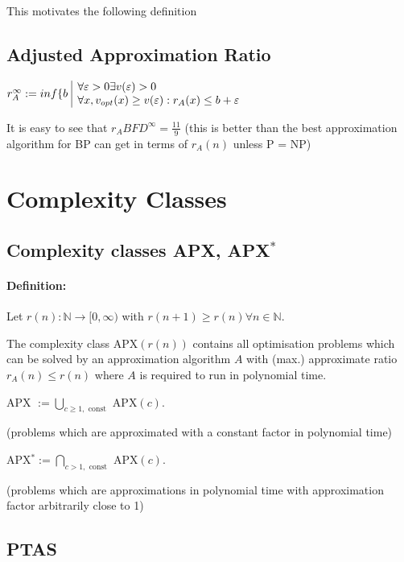\documentclass[11pt]{article}
\theoremstyle{definition}
\theoremstyle{definition}
\begin{document}

This motivates the following definition

\subsection{Adjusted Approximation Ratio}

$ r_A^\infty := inf \{ b ~ \begin{array}{| l} \forall \varepsilon > 0 \exists v(\varepsilon) > 0 \\ \forall x, v_{opt}(x) \geq v(\varepsilon) : r_A (x) \leq b + \varepsilon \end{array} $

It is easy to see that $ r_A{BFD}^\infty = \frac{11}{9} $ (this is better than the best approximation algorithm for BP can get in terms of $ r_A(n) $ unless P = NP)

\section{Complexity Classes}
\subsection{Complexity classes APX, APX$^\ast$}

\paragraph{Definition:} Let $ r(n) : \mathbb{N} \rightarrow [0, \infty) $ with $ r(n + 1) \geq r(n) \forall n \in \mathbb{N} $.

The complexity class APX$(r(n)) $ contains all optimisation problems which can be solved by an approximation algorithm $ A $ with (max.) approximate ratio $ r_A(n) \leq r(n) $ where $ A $ is required to run in polynomial time. \medskip

APX $ := \bigcup \limits_{c \geq 1, \text{ const}} $ APX$(c) $.

(problems which are approximated with a constant factor in polynomial time) \medskip

APX$^\ast := \bigcap \limits_{c > 1, \text{ const}} $ APX$(c) $.

(problems which are approximations in polynomial time with approximation factor arbitrarily close to 1)

\subsection{PTAS}
\end{document}
